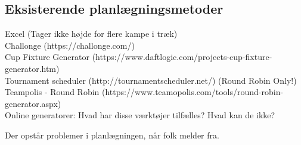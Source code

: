  
 
\subsection{Eksisterende planlægningsmetoder}
Excel (Tager ikke højde for flere kampe i træk)\\
Challonge (https://challonge.com/)\\
Cup Fixture Generator (https://www.daftlogic.com/projects-cup-fixture-generator.htm)\\ 
Tournament scheduler (http://tournamentscheduler.net/) (Round Robin Only!)\\
Teampolis - Round Robin (https://www.teamopolis.com/tools/round-robin-generator.aspx)\\

Online generatorer:
Hvad har disse værktøjer tilfælles? Hvad kan de ikke?

Der opstår problemer i planlægningen, når folk melder fra.
